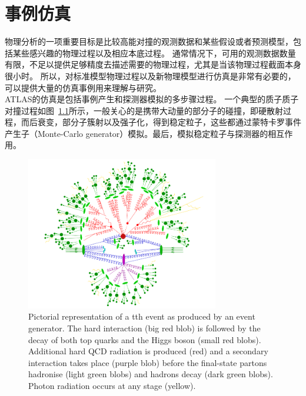 \chapter{事例仿真}\label{chap:evt_simulation}
物理分析的一项重要目标是比较高能对撞的观测数据和某些假设或者预测模型，包括某些感兴趣的物理过程以及相应本底过程。
通常情况下，可用的观测数据数量有限，不足以提供足够精度去描述需要的物理过程，尤其是当该物理过程截面本身很小时。
所以，对标准模型物理过程以及新物理模型进行仿真是非常有必要的，可以提供大量的仿真事例用来理解与研究。\\
ATLAS的仿真是包括事例产生和探测器模拟的多步骤过程。
一个典型的质子质子对撞过程如图~\ref{fig:evt_egen_chain}所示，一般关心的是携带大动量的部分子的碰撞，即硬散射过程，而后衰变，部分子簇射以及强子化，得到稳定粒子，这些都通过蒙特卡罗事件产生子（Monte-Carlo generator）模拟\cite{BUCKLEY2011145}。最后，模拟稳定粒子与探测器的相互作用。
\begin{figure}
\centering
\includegraphics[width=0.75\textwidth]{fig/evt_egen_chain.png}
\caption{Pictorial representation of a tth event as produced by an event generator. The hard interaction (big red blob) is followed by the decay of both top quarks and the Higgs boson (small red blobs). Additional hard QCD radiation is produced (red) and a secondary interaction takes place (purple blob) before the final-state partons hadronise (light green blobs) and hadrons decay (dark green blobs). Photon radiation occurs at any stage (yellow).\cite{Gleisberg:2008ta}}
\label{fig:evt_egen_chain}
\end{figure}
